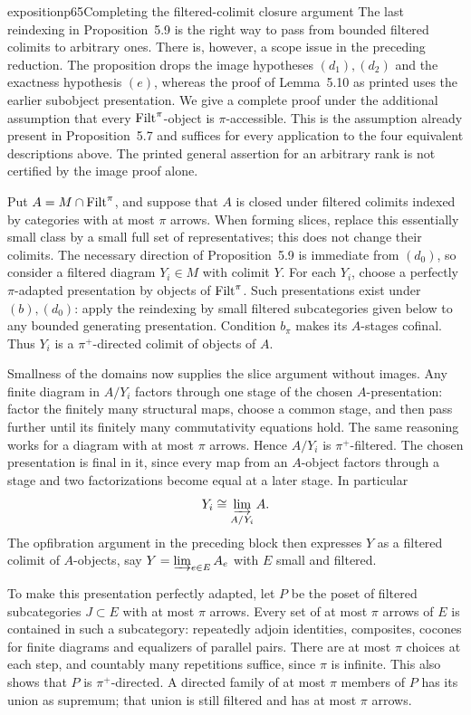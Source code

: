 \begin{dcomment}{exposition}{p65}{Completing the filtered-colimit closure argument}
The last reindexing in Proposition~5.9 is the right way to pass from bounded filtered colimits to arbitrary ones. There is, however, a scope issue in the preceding reduction. The proposition drops the image hypotheses $(d_1),(d_2)$ and the exactness hypothesis $(e)$, whereas the proof of Lemma~5.10 as printed uses the earlier subobject presentation. We give a complete proof under the additional assumption that every $\mathrm{Filt}^\pi$-object is $\pi$-accessible. This is the assumption already present in Proposition~5.7 and suffices for every application to the four equivalent descriptions above. The printed general assertion for an arbitrary rank is not certified by the image proof alone.

Put $A=M\cap\mathrm{Filt}^\pi$, and suppose that $A$ is closed under filtered colimits indexed by categories with at most $\pi$ arrows. When forming slices, replace this essentially small class by a small full set of representatives; this does not change their colimits. The necessary direction of Proposition~5.9 is immediate from $(d_0)$, so consider a filtered diagram $Y_i\in M$ with colimit $Y$. For each $Y_i$, choose a perfectly $\pi$-adapted presentation by objects of $\mathrm{Filt}^\pi$. Such presentations exist under $(b),(d_0)$: apply the reindexing by small filtered subcategories given below to any bounded generating presentation. Condition $b_\pi$ makes its $A$-stages cofinal. Thus $Y_i$ is a $\pi^+$-directed colimit of objects of $A$.

Smallness of the domains now supplies the slice argument without images. Any finite diagram in $A/Y_i$ factors through one stage of the chosen $A$-presentation: factor the finitely many structural maps, choose a common stage, and then pass further until its finitely many commutativity equations hold. The same reasoning works for a diagram with at most $\pi$ arrows. Hence $A/Y_i$ is $\pi^+$-filtered. The chosen presentation is final in it, since every map from an $A$-object factors through a stage and two factorizations become equal at a later stage. In particular
\[
 Y_i\cong\varinjlim_{A/Y_i}A.
\]
The opfibration argument in the preceding block then expresses $Y$ as a filtered colimit of $A$-objects, say $Y=\varinjlim_{e\in E}A_e$ with $E$ small and filtered.

To make this presentation perfectly adapted, let $P$ be the poset of filtered subcategories $J\subset E$ with at most $\pi$ arrows. Every set of at most $\pi$ arrows of $E$ is contained in such a subcategory: repeatedly adjoin identities, composites, cocones for finite diagrams and equalizers of parallel pairs. There are at most $\pi$ choices at each step, and countably many repetitions suffice, since $\pi$ is infinite. This also shows that $P$ is $\pi^+$-directed. A directed family of at most $\pi$ members of $P$ has its union as supremum; that union is still filtered and has at most $\pi$ arrows.


\end{dcomment}
